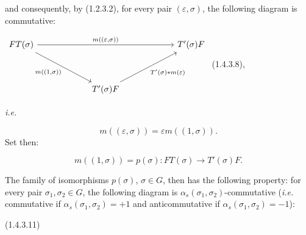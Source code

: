 %
and consequently, by (1.2.3.2), for every pair
$(\varepsilon,\sigma)$, the following diagram is commutative:

\begin{center}
  $\begin{tikzcd}[ampersand replacement=\&,column sep=6em,row sep=3.5em]
    FT(\sigma)
      \arrow[rr,"{m((\varepsilon,\sigma))}"]
      \arrow[dr,"{m((1,\sigma))}"']
      \& \& T'(\sigma)F \\
      \& T'(\sigma)F
        \arrow[ur,"{T'(\sigma)*m(\varepsilon)}"'] \&
  \end{tikzcd}$
  \hfill\textup{(1.4.3.8)},
\end{center}

\noindent\emph{i.e.}

\begin{equation}
  m((\varepsilon,\sigma))=\varepsilon m((1,\sigma)).
  \tag{1.4.3.9}
\end{equation}
Set then:

\begin{equation}
  m((1,\sigma))=p(\sigma)\colon
  FT(\sigma)\longrightarrow T'(\sigma)F.
  \tag{1.4.3.10}
\end{equation}

The family of isomorphisms $p(\sigma)$, $\sigma\in G$, then has the
following property: for every pair $\sigma_1,\sigma_2\in G$, the
following diagram is $\alpha_s(\sigma_1,\sigma_2)$-commutative
(\emph{i.e.} commutative if $\alpha_s(\sigma_1,\sigma_2)=+1$ and
anticommutative if $\alpha_s(\sigma_1,\sigma_2)=-1$):

\begin{center}
  \hfill\textup{(1.4.3.11)}
\end{center}

